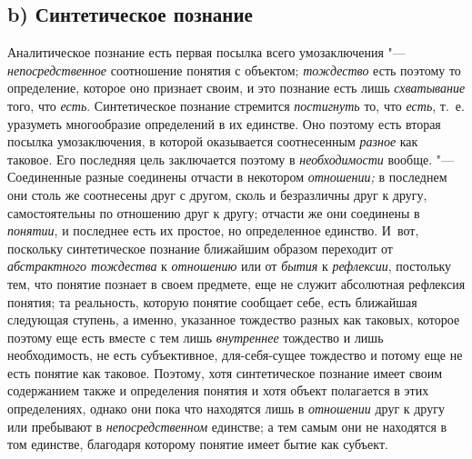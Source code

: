 \subsection[b) Синтетическое познание]{b) Синтетическое познание}

Аналитическое познание есть первая посылка всего
умозаключения "--- {\em непосредственное}
соотношение понятия с объектом;
{\em тождество} есть
поэтому то определение, которое оно признает своим, и это познание есть
лишь {\em схватывание}
того, что {\em есть}.
Синтетическое познание стремится
{\em постигнуть} то, что
{\em есть}, т.~е.
уразуметь многообразие определений в их единстве. Оно поэтому есть вторая
посылка умозаключения, в
которой
оказывается соотнесенным
{\em разное} как таковое.
Его последняя цель заключается поэтому в
{\em необходимости}
вообще. "--- Соединенные разные соединены отчасти
в некотором {\em отношении;}
в последнем они столь же соотнесены друг с другом, сколь и
безразличны друг к другу, самостоятельны по отношению друг к другу; отчасти
же они соединены в {\em понятии},
и последнее есть их простое, но определенное единство. И~вот,
поскольку синтетическое познание ближайшим образом переходит от
{\em абстрактного тождества}
к {\em отношению}
или от {\em бытия}
к {\em рефлексии},
постольку тем, что понятие познает в своем предмете, еще не
служит абсолютная рефлексия понятия; та реальность, которую понятие
сообщает себе, есть ближайшая следующая ступень, а именно, указанное
тождество разных как таковых, которое поэтому еще есть вместе с тем лишь
{\em внутреннее}
тождество и лишь необходимость, не есть субъективное,
для-себя-сущее тождество и потому еще не есть понятие как таковое. Поэтому,
хотя синтетическое познание имеет своим содержанием также и определения
понятия и хотя объект полагается в этих определениях, однако они пока что
находятся лишь в {\em отношении}
друг к другу или пребывают в
{\em непосредственном}
единстве; а тем самым они не находятся в том единстве,
благодаря которому понятие имеет бытие как субъект.

